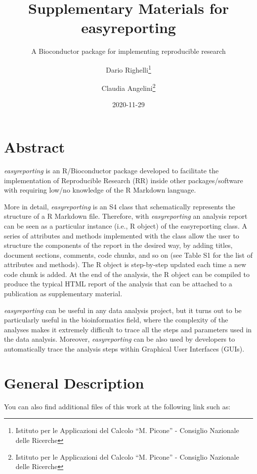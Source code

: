 \documentclass[]{article}
\title{Supplementary Materials for easyreporting}
\subtitle{A Bioconductor package for implementing reproducible research}
\author{Dario Righelli\footnote{Istituto per le Applicazioni del Calcolo ``M.
  Picone'' - Consiglio Nazionale delle Ricerche} \and Claudia Angelini\footnote{Istituto per le Applicazioni del Calcolo ``M.
  Picone'' - Consiglio Nazionale delle Ricerche}}
\date{2020-11-29}
\begin{document}
\maketitle

\newcommand{\beginsupplement}{%
        \setcounter{table}{0}
        \renewcommand{\thetable}{S\arabic{table}}%
        \setcounter{figure}{0}
        \renewcommand{\thefigure}{S\arabic{figure}}%
     }

\hypertarget{abstract}{%
\section{Abstract}\label{abstract}}

\emph{easyreporting} is an R/Bioconductor package developed to
facilitate the implementation of Reproducible Research (RR) inside other
packages/software with requiring low/no knowledge of the R Markdown
language.

More in detail, \emph{easyreporting} is an S4 class that schematically
represents the structure of a R Markdown file. Therefore, with
\emph{easyreporting} an analysis report can be seen as a particular
instance (i.e., R object) of the easyreporting class. A series of
attributes and methods implemented with the class allow the user to
structure the components of the report in the desired way, by adding
titles, document sections, comments, code chunks, and so on (see Table
S1 for the list of attributes and methods). The R object is step-by-step
updated each time a new code chunk is added. At the end of the analysis,
the R object can be compiled to produce the typical HTML report of the
analysis that can be attached to a publication as supplementary
material.

\emph{easyreporting} can be useful in any data analysis project, but it
turns out to be particularly useful in the bioinformatics field, where
the complexity of the analyses makes it extremely difficult to trace all
the steps and parameters used in the data analysis. Moreover,
\emph{easyreporting} can be also used by developers to automatically
trace the analysis steps within Graphical User Interfaces (GUIs).

\hypertarget{general-description}{%
\section{General Description}\label{general-description}}

You can also find additional files of this work at the following link
such as:
\end{document}

